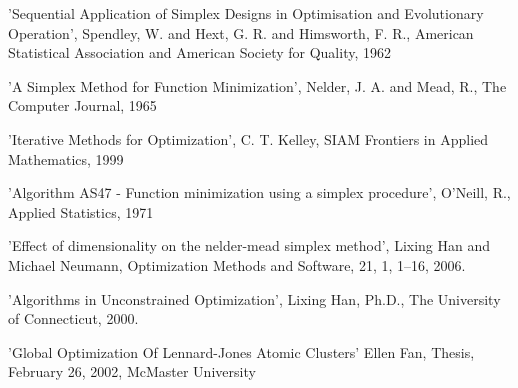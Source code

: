 \begin{References}\relax
'Sequential Application of Simplex Designs in Optimisation and Evolutionary
Operation', Spendley, W. and Hext, G. R. and Himsworth, F. R., American
Statistical Association and American Society for Quality, 1962

'A Simplex Method for Function Minimization', Nelder, J. A. and Mead, R., The
Computer Journal, 1965

'Iterative Methods for Optimization', C. T. Kelley, SIAM Frontiers in Applied
Mathematics, 1999

'Algorithm AS47 - Function minimization using a simplex procedure', O'Neill, R.,
Applied Statistics, 1971

'Effect of dimensionality on the nelder-mead simplex method', Lixing Han and
Michael Neumann, Optimization Methods and Software, 21, 1, 1--16, 2006.

'Algorithms in Unconstrained Optimization', Lixing Han, Ph.D., The University of
Connecticut, 2000.

'Global Optimization Of Lennard-Jones Atomic Clusters' Ellen Fan, Thesis,
February 26, 2002, McMaster University
\end{References}
%
\begin{SeeAlso}\relax
{}
\end{SeeAlso}
%
